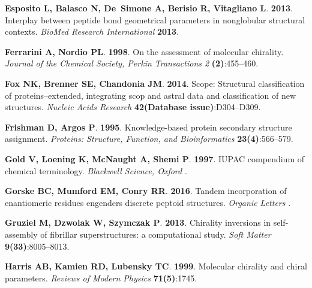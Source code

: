 \documentclass[fleqn,10pt,lineno]{wlpeerj} %
\begin{document}
\begin{thebibliography}{60}
\textbf{Esposito L, Balasco N, De~Simone A, Berisio R, Vitagliano L}.
  \textbf{2013}.
\newblock Interplay between peptide bond geometrical parameters in nonglobular
  structural contexts.
\newblock \emph{BioMed Research International} \textbf{2013}.

\textbf{Ferrarini A, Nordio PL}. \textbf{1998}.
\newblock On the assessment of molecular chirality.
\newblock \emph{Journal of the Chemical Society, Perkin Transactions 2}
  \textbf{(2)}:455--460.

\textbf{Fox NK, Brenner SE, Chandonia JM}. \textbf{2014}.
\newblock Scope: Structural classification of proteins--extended, integrating
  scop and astral data and classification of new structures.
\newblock \emph{Nucleic Acids Research} \textbf{42(Database issue)}:D304--D309.

\textbf{Frishman D, Argos P}. \textbf{1995}.
\newblock Knowledge-based protein secondary structure assignment.
\newblock \emph{Proteins: Structure, Function, and Bioinformatics}
  \textbf{23(4)}:566--579.

\textbf{Gold V, Loening K, McNaught A, Shemi P}. \textbf{1997}.
\newblock IUPAC compendium of chemical terminology.
\newblock \emph{Blackwell Science, Oxford} .

\textbf{Gorske BC, Mumford EM, Conry RR}. \textbf{2016}.
\newblock Tandem incorporation of enantiomeric residues engenders discrete
  peptoid structures.
\newblock \emph{Organic Letters} .

\textbf{Gruziel M, Dzwolak W, Szymczak P}. \textbf{2013}.
\newblock Chirality inversions in self-assembly of fibrillar superstructures: a
  computational study.
\newblock \emph{Soft Matter} \textbf{9(33)}:8005--8013.

\textbf{Harris AB, Kamien RD, Lubensky TC}. \textbf{1999}.
\newblock Molecular chirality and chiral parameters.
\newblock \emph{Reviews of Modern Physics} \textbf{71(5)}:1745.


\end{thebibliography}
\end{document}
